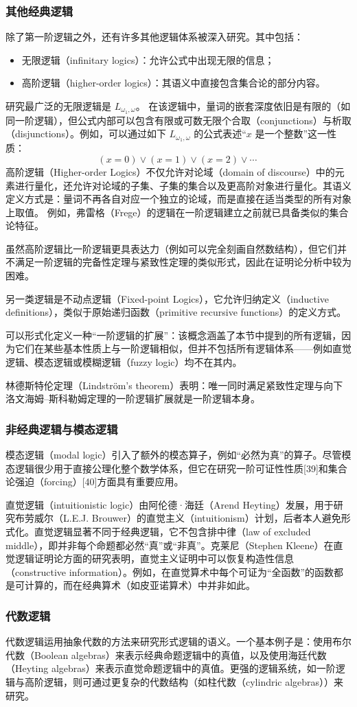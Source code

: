\subsubsection{其他经典逻辑}
除了第一阶逻辑之外，还有许多其他逻辑体系被深入研究。其中包括：
\begin{itemize}
  \item 无限逻辑（infinitary logics）：允许公式中出现无限的信息；
  \item 高阶逻辑（higher-order logics）：其语义中直接包含集合论的部分内容。
\end{itemize}
研究最广泛的无限逻辑是 \( L_{\omega_{1}, \omega} \)。  在该逻辑中，量词的嵌套深度依旧是有限的（如同一阶逻辑），但公式内部可以包含有限或可数无限个合取（conjunctions）与析取（disjunctions）。例如，可以通过如下 \( L_{\omega_{1}, \omega} \) 的公式表述“\(x\) 是一个整数”这一性质：
\[
(x = 0) \lor (x = 1) \lor (x = 2) \lor \cdots~
\]
高阶逻辑（Higher-order Logics）不仅允许对论域（domain of discourse）中的元素进行量化，还允许对论域的子集、子集的集合以及更高阶对象进行量化。其语义定义方式是：量词不再各自对应一个独立的论域，而是直接在适当类型的所有对象上取值。 例如，弗雷格（Frege）的逻辑在一阶逻辑建立之前就已具备类似的集合论特征。

虽然高阶逻辑比一阶逻辑更具表达力（例如可以完全刻画自然数结构），但它们并不满足一阶逻辑的完备性定理与紧致性定理的类似形式，因此在证明论分析中较为困难。


另一类逻辑是不动点逻辑（Fixed-point Logics），它允许归纳定义（inductive definitions），类似于原始递归函数（primitive recursive functions）的定义方式。

可以形式化定义一种“一阶逻辑的扩展”：该概念涵盖了本节中提到的所有逻辑，因为它们在某些基本性质上与一阶逻辑相似，但并不包括所有逻辑体系——例如直觉逻辑、模态逻辑或模糊逻辑（fuzzy logic）均不在其内。

林德斯特伦定理（Lindström's theorem）表明：唯一同时满足紧致性定理与向下洛文海姆–斯科勒姆定理的一阶逻辑扩展就是一阶逻辑本身。
\subsubsection{非经典逻辑与模态逻辑}
模态逻辑（modal logic）引入了额外的模态算子，例如“必然为真”的算子。尽管模态逻辑很少用于直接公理化整个数学体系，但它在研究一阶可证性性质[39]和集合论强迫（forcing）[40]方面具有重要应用。

直觉逻辑（intuitionistic logic）由阿伦德·海廷（Arend Heyting）发展，用于研究布劳威尔（L.E.J. Brouwer）的直觉主义（intuitionism）计划，后者本人避免形式化。直觉逻辑显著不同于经典逻辑，它不包含排中律（law of excluded middle），即并非每个命题都必然“真”或“非真”。克莱尼（Stephen Kleene）在直觉逻辑证明论方面的研究表明，直觉主义证明中可以恢复构造性信息（constructive information）。例如，在直觉算术中每个可证为“全函数”的函数都是可计算的，而在经典算术（如皮亚诺算术）中并非如此。
\subsubsection{代数逻辑}
代数逻辑运用抽象代数的方法来研究形式逻辑的语义。一个基本例子是：使用布尔代数（Boolean algebras）来表示经典命题逻辑中的真值，以及使用海廷代数（Heyting algebras）来表示直觉命题逻辑中的真值。更强的逻辑系统，如一阶逻辑与高阶逻辑，则可通过更复杂的代数结构（如柱代数（cylindric algebras））来研究。

